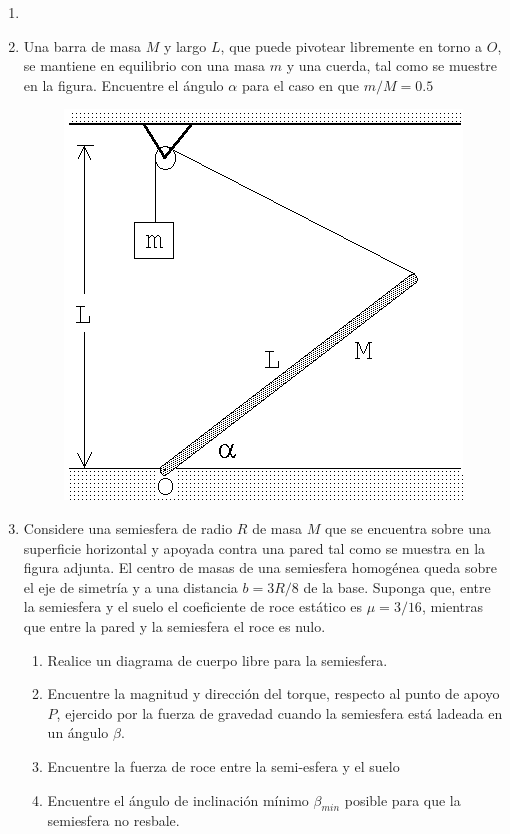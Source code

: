 \documentclass[letterpaper,11pt]{article}
\begin{document}
\vspace{-1cm}
\begin{enumerate}\setlength{\itemsep}{0.4cm}

\item[]

\item Una barra de masa $M$ y largo $L$, que puede pivotear libremente en torno a $O$, se mantiene en equilibrio con una masa $m$ y una cuerda, tal como se muestre en la figura. Encuentre el ángulo $\alpha$ para el caso en que $m/M=0.5$

\begin{figure}[H]
    \centering
    \includegraphics[width=0.25\linewidth]{2021-2/img/aux12/aux12-barra-polea.png}
\end{figure}

\item Considere una semiesfera de radio $R$ de masa $M$ que se encuentra sobre una superficie horizontal y apoyada contra una pared tal como se muestra en la figura adjunta. El centro de masas de una semiesfera homogénea queda sobre el eje de simetría y a una distancia ${b} = 3 R / 8$ de la base. Suponga que, entre la semiesfera y el suelo el coeficiente de roce estático es $\mu = 3 / 16$, mientras que entre la pared y la semiesfera el roce es nulo.

\begin{multicols}{2}
    \begin{enumerate}
        \item Realice un diagrama de cuerpo libre para la semiesfera.
        \item Encuentre la magnitud y dirección del torque, respecto al punto de apoyo $P$, ejercido por la fuerza de gravedad cuando la semiesfera está ladeada en un ángulo $\beta$.
        \item Encuentre la fuerza de roce entre la semi-esfera y el suelo
        \item Encuentre el ángulo de inclinación mínimo $\beta_{min}$ posible para que la semiesfera no resbale.
    \end{enumerate}
    
    \columnbreak
    

\end{multicols}
\end{enumerate}
\end{document}
